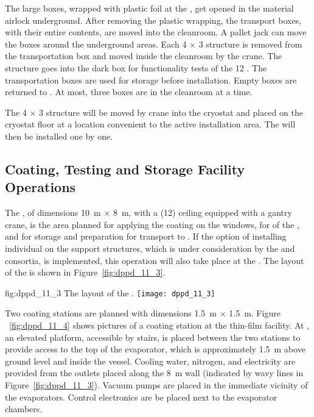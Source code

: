 The large  boxes, wrapped with plastic foil at the , get opened in the material airlock underground. After removing the plastic wrapping, the transport boxes, with their entire contents, are moved into the cleanroom. A pallet jack can move the   boxes around the underground areas. Each \num{4} $\times$ \num{3} structure is removed from the transportation box and moved inside the cleanroom by the crane. The structure goes into the dark box for functionality tests of the \num{12} . The transportation boxes are used for storage before installation. Empty boxes are returned to . At most, three  boxes are in the cleanroom at a time.

The \num{4} $\times$ \num{3} structure will be moved by crane into the cryostat and placed on the cryostat floor at a location convenient to the active installation area. The  will then be installed one by one. 

\subsection{Coating, Testing and Storage Facility Operations}
\label{subsec:dp-pds-itf}

The , of dimensions \SI{10}{\m} $\times$ \SI{8}{\m}, with a (\SI{12}{\ft}) ceiling equipped with a gantry crane, is the area planned for applying the  coating on the  windows, for  of the , and for storage and preparation for transport to . If the option of installing individual  on the  support structures, which is under consideration by the \dual {} and  consortia, is %
implemented, this operation will also take place at the . The layout of the  is shown in Figure~\ref{fig:dppd_11_3}.

\begin{dunefigure}{fig:dppd_11_3}
{The layout of the .}
\texttt{[image: dppd\_11\_3]}
\end{dunefigure}

Two coating stations are planned with dimensions \SI{1.5}{\m} $\times$ \SI{1.5}{\m}. Figure ~\ref{fig:dppd_11_4} shows pictures of a  coating station at the  thin-film facility. At , an elevated platform, accessible by stairs, is placed between the two stations %
to provide access to the top of the evaporator, which is approximately \SI{1.5}{\m} above ground level and inside the vessel. Cooling water, nitrogen, and electricity are provided from the outlets placed along the \SI{8}{\m} wall (indicated by wavy lines in Figure~\ref{fig:dppd_11_3}). Vacuum pumps are placed in the immediate vicinity of the evaporators. Control electronics are be placed next to the evaporator chambers. 

